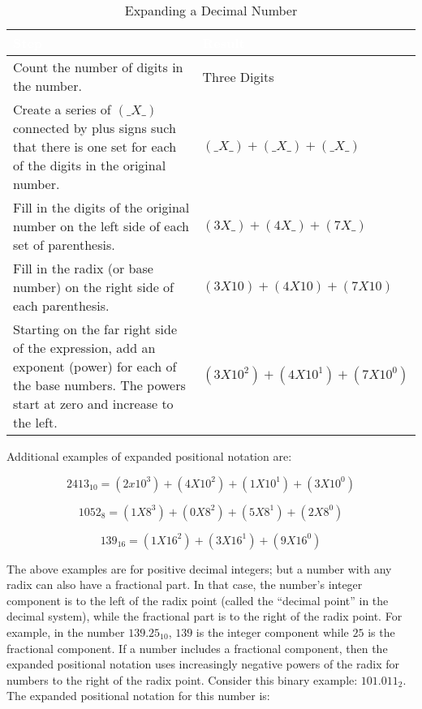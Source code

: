 \begin{table}[H]
  \sffamily
  \newcommand{\head}[1]{\textcolor{white}{\textbf{#1}}}      
  \begin{center}
    \begin{tabular}{ p{7cm} l } 
      \hline
      \rowcolor{black!75}
      \head{Step} & \head{Result} \\ 
      \hline 
      Count the number of digits in the number. & Three Digits  \\ 
      Create a series of $ (\_ X\_) $ connected by plus signs such that there is one set for each of the digits in the original number. & $ ( \_X\_ ) + ( \_X\_ ) + ( \_X\_ ) $  \\ \hline
      Fill in the digits of the original number on the left side of each set of parenthesis. & $ ( 3X\_ ) + ( 4X\_ ) + ( 7X\_ ) $  \\ 
      Fill in the radix (or base number) on the right side of each parenthesis. & $ ( 3X10 ) + ( 4X10 ) + ( 7X10 ) $  \\ 
      Starting on the far right side of the expression, add an exponent (power) for each of the base numbers. The powers start at zero and increase to the left. & $ ( 3X10^2 ) + ( 4X10^1 ) + ( 7X10^0 ) $ \\
      \hline
    \end{tabular} 
  \end{center}
  \caption{Expanding a Decimal Number}
  \label{MF:tab:expand_347}
\end{table}

Additional examples of expanded positional notation are: 

\begin{equation}
2413_{10}=(2x10^3)+(4X10^2)+(1X10^1)+(3X10^0)
\end{equation} 

\begin{equation}
1052_8=(1X8^3)+(0X8^2)+(5X8^1)+(2X8^0)  
\end{equation}

\begin{equation}
139_{16}=(1X16^2)+(3X16^1)+(9X16^0)
\end{equation}

The above examples are for positive decimal integers; but a number with any radix can also have a fractional part. In that case, the number's integer component is to the left of the radix point (called the ``decimal point'' in the decimal system), while the fractional part is to the right of the radix point. For example, in the number $ 139.25_{10} $, $ 139 $ is the integer component while $ 25 $ is the fractional component. If a number includes a fractional component, then the expanded positional notation uses increasingly negative powers of the radix for numbers to the right of the radix point. Consider this binary example: $ 101.011_2 $. The expanded positional notation for this number is:


